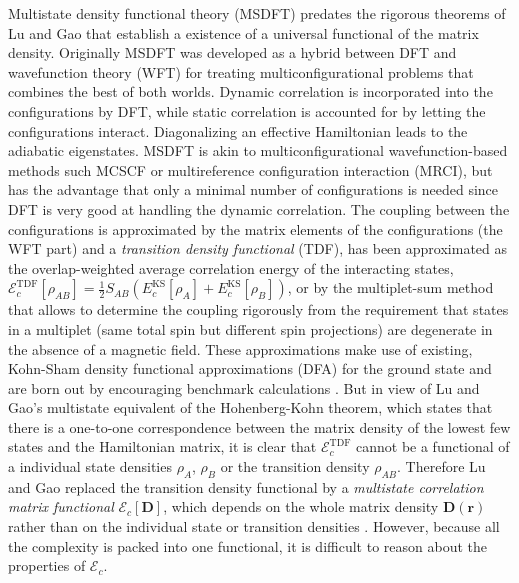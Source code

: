 \documentclass[journal=jpclcd,manuscript=letter]{achemso}
\newcommand\m[1]{\mathbf{#1}}
\renewcommand\vec[1]{\mathbf{#1}}
\begin{document}
Multistate density functional theory (MSDFT)
\cite{Gao2016} predates the rigorous theorems of Lu and Gao \cite{Lu2022JPCL}
that establish a existence of a universal functional of the matrix density.
Originally MSDFT was developed as a hybrid between DFT and wavefunction theory (WFT) for treating multiconfigurational problems
that combines the best of both worlds. Dynamic correlation is incorporated
into the configurations by DFT, while static correlation is accounted for by letting the configurations interact.
Diagonalizing an effective Hamiltonian leads to the adiabatic eigenstates. MSDFT is akin to multiconfigurational wavefunction-based methods such
MCSCF or multireference configuration interaction (MRCI),
but has the advantage that only a minimal number of configurations is needed \cite{Lu2022fundamental} since DFT
is very good at handling the dynamic correlation. \cite{Leininger1997combining}
The coupling between the configurations is approximated by the matrix elements of the configurations (the WFT part)
and a \emph{transition density functional} (TDF), \cite[Eqn.~(5)]{Grofe2017} has been
approximated as the overlap-weighted average correlation energy of the interacting states, \cite[Eqn.~(6)]{Gao2016}
$\mathcal{E}^{\text{TDF}}_c[\rho_{AB}] = \frac{1}{2} S_{AB} \left( E_c^{\text{KS}}[\rho_A] + E_c^{\text{KS}}[\rho_B] \right)$,
or by the multiplet-sum method \cite{Ziegler1977,Grofe2017} that allows to determine the coupling rigorously from the requirement that
states in a multiplet (same total spin but different spin projections) are degenerate in the absence of a magnetic field.
These approximations make use of existing, Kohn-Sham density functional approximations (DFA)
for the ground state and are born out by encouraging benchmark calculations \cite{Zhu2023}.
But in view of Lu and Gao's multistate equivalent of the Hohenberg-Kohn theorem,
which states that there is a one-to-one correspondence between the matrix density of the lowest few states and the Hamiltonian matrix,
it is clear that $\mathcal{E}^{\text{TDF}}_c$ cannot be a functional of a individual state densities $\rho_A$, $\rho_B$
or the transition density $\rho_{AB}$. Therefore Lu and Gao
replaced the transition density functional by a \emph{multistate correlation matrix functional} $\mathcal{E}_{c}[\m{D}]$, which depends
on the whole matrix density $\m{D}(\vec{r})$ rather than on the individual state or transition densities \cite{Lu2022fundamental}.
However, because all the complexity is packed into one
functional, it is difficult to reason about the properties of $\mathcal{E}_c$.
\end{document}
